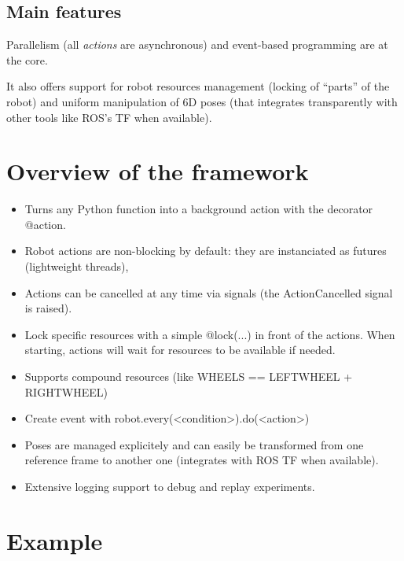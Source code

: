 \documentclass[a4paper, 10pt, conference]{ieeeconf}      %
\begin{document}
\subsection{Main features}

Parallelism (all \emph{actions} are asynchronous) and event-based programming
are at the core.

It also offers support for robot resources management (locking of ``parts'' of
the robot) and uniform manipulation of 6D poses (that integrates transparently
with other tools like ROS's TF when available).

\section{Overview of the framework}


\begin{itemize}
    \item Turns any Python function into a background action with the decorator
        @action.
    \item Robot actions are non-blocking by default: they are instanciated as
        futures (lightweight threads),
    \item Actions can be cancelled at any time via signals (the
        ActionCancelled signal is raised).
    \item Lock specific resources with a simple @lock(...) in front of the
        actions. When starting, actions will wait for resources to be
        available if needed.
    \item Supports compound resources (like WHEELS == LEFTWHEEL +
        RIGHTWHEEL)
    \item Create event with robot.every(<condition>).do(<action>)
    \item Poses are managed explicitely and can easily be
        transformed from one reference frame to another one
        (integrates with ROS TF when available).
    \item Extensive logging support to debug and replay
        experiments.
\end{itemize}

\section{Example}
\end{document}

